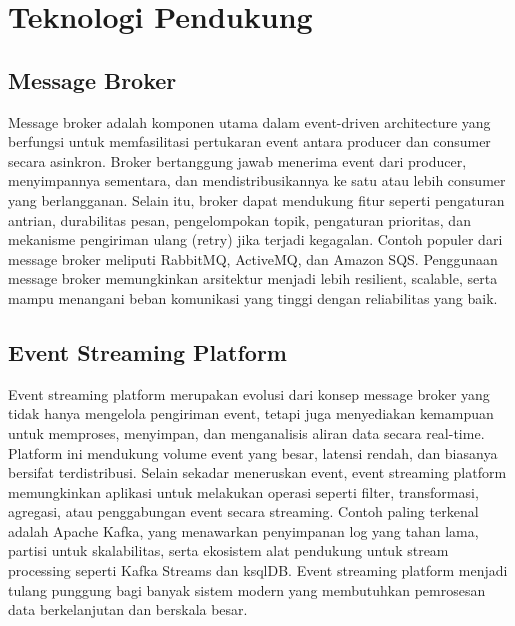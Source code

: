\section{Teknologi Pendukung}

\subsection{Message Broker}
Message broker adalah komponen utama dalam event-driven architecture yang berfungsi untuk memfasilitasi pertukaran event antara producer dan consumer secara asinkron. Broker bertanggung jawab menerima event dari producer, menyimpannya sementara, dan mendistribusikannya ke satu atau lebih consumer yang berlangganan. Selain itu, broker dapat mendukung fitur seperti pengaturan antrian, durabilitas pesan, pengelompokan topik, pengaturan prioritas, dan mekanisme pengiriman ulang (retry) jika terjadi kegagalan. Contoh populer dari message broker meliputi RabbitMQ, ActiveMQ, dan Amazon SQS. Penggunaan message broker memungkinkan arsitektur menjadi lebih resilient, scalable, serta mampu menangani beban komunikasi yang tinggi dengan reliabilitas yang baik.

\subsection{Event Streaming Platform}
Event streaming platform merupakan evolusi dari konsep message broker yang tidak hanya mengelola pengiriman event, tetapi juga menyediakan kemampuan untuk memproses, menyimpan, dan menganalisis aliran data secara real-time. Platform ini mendukung volume event yang besar, latensi rendah, dan biasanya bersifat terdistribusi. Selain sekadar meneruskan event, event streaming platform memungkinkan aplikasi untuk melakukan operasi seperti filter, transformasi, agregasi, atau penggabungan event secara streaming. Contoh paling terkenal adalah Apache Kafka, yang menawarkan penyimpanan log yang tahan lama, partisi untuk skalabilitas, serta ekosistem alat pendukung untuk stream processing seperti Kafka Streams dan ksqlDB. Event streaming platform menjadi tulang punggung bagi banyak sistem modern yang membutuhkan pemrosesan data berkelanjutan dan berskala besar.

